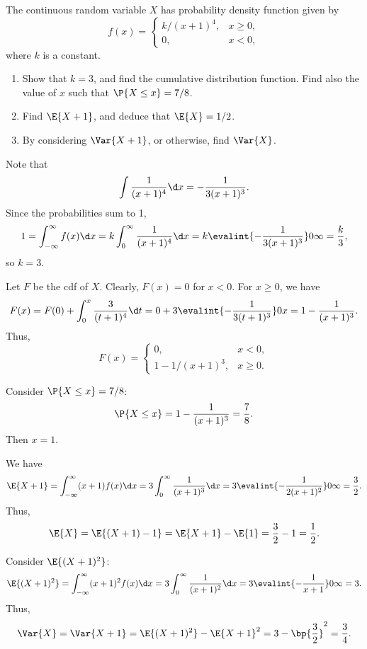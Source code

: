 \begin{problem}
    The continuous random variable $X$ has probability density function given by \[f(x) = \begin{cases}
        k/(x+1)^4, & x \geq 0,\\
        0, & x < 0,
    \end{cases}\] where $k$ is a constant.

    \begin{enumerate}
        \item Show that $k=3$, and find the cumulative distribution function. Find also the value of $x$ such that $\P{X \leq x}= 7/8$.
        \item Find $\E{X + 1}$, and deduce that $\E{X} = 1/2$.
        \item By considering $\Var{X+1}$, or otherwise, find $\Var{X}$.
    \end{enumerate}
\end{problem}
\begin{solution}
    \begin{ppart}
        Note that \[\int \frac1{(x+1)^4} \d x = -\frac1{3 (x+1)^3}.\] Since the probabilities sum to 1, \[1 = \int_{-\infty}^{\infty} f(x) \d x = k \int_0^\infty \frac{1}{(x+1)^4} \d x = k \evalint{-\frac{1}{3(x+1)^3}}0\infty = \frac{k}3,\] so $k = 3$.

        Let $F$ be the cdf of $X$. Clearly, $F(x) = 0$ for $x < 0$. For $x \geq 0$, we have \[F(x) = F(0) + \int_0^x \frac3{(t+1)^4} \d t = 0 + 3 \evalint{-\frac1{3(t+1)^3}}0x = 1 - \frac{1}{(x+1)^3}.\] Thus, \[F(x) = \begin{cases}
            0, & x < 0,\\
            1 - 1/(x+1)^3, & x \geq 0.
        \end{cases}\]

        Consider $\P{X \leq x} = 7/8$: \[\P{X \leq x} = 1 - \frac1{(x+1)^3} = \frac78.\] Then $x = 1$.
    \end{ppart}
    \begin{ppart}
        We have \[\E{X + 1} = \int_{-\infty}^\infty (x+1) f(x) \d x = 3\int_0^\infty \frac{1}{(x+1)^3} \d x = 3\evalint{-\frac1{2(x+1)^2}}0\infty = \frac32.\] Thus, \[\E{X} = \E{(X+1) - 1} = \E{X + 1} - \E{1} = \frac32 - 1 = \frac12.\]
    \end{ppart}
    \begin{ppart}
        Consider $\E{(X+1)^2}$: \[\E{(X+1)^2} = \int_{-\infty}^\infty (x+1)^2 f(x) \d x = 3 \int_0^\infty \frac1{(x+1)^2} \d x = 3\evalint{-\frac1{x+1}}0\infty = 3.\] Thus, \[\Var{X} = \Var{X + 1} = \E{(X+1)^2} - \E{X+1}^2 = 3 - \bp{\frac32}^2 = \frac34.\]
    \end{ppart}
\end{solution}

